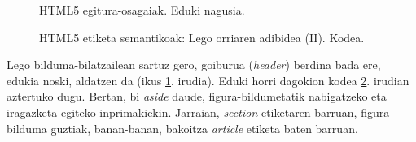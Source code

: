 \begin{figure}[ht]
	\centering
{}
\caption{HTML5 egitura-osagaiak. Eduki nagusia.}
\label{fig:legohtml5edukia}
\end{figure}

\begin{figure}[ht]
	\centering
{}
\caption{HTML5 etiketa semantikoak: Lego orriaren adibidea (II). Kodea.}
\label{fig:legohtmledukiakodea}
\end{figure}

Lego bilduma-bilatzailean sartuz gero, goiburua (\textit{header}) berdina bada ere, edukia noski, aldatzen da (ikus \ref{fig:legohtml5edukia}. irudia). Eduki horri dagokion kodea \ref{fig:legohtmledukiakodea}. irudian aztertuko dugu. Bertan, bi \textit{aside} daude, figura-bildumetatik nabigatzeko eta iragazketa egiteko inprimakiekin. Jarraian, \textit{section} etiketaren barruan, figura-bilduma guztiak, banan-banan, bakoitza \textit{article} etiketa baten barruan.

